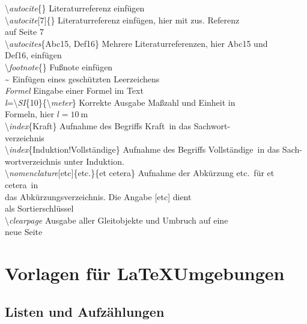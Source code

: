 \begin{tabbing}
	\textbackslash \textit{autocite}\{\}	\> Literaturreferenz einfügen\\
	\textbackslash \textit{autocite}[7]\{\}	\> Literaturreferenz einfügen, hier mit zus. Referenz\\
	\> auf Seite 7\\
\textbackslash \textit{autocites}\{Abc15, Def16\}	\> Mehrere Literaturreferenzen, hier Abc15 und \\
\> Def16, einfügen\\
\textbackslash \textit{footnote}\{\}	\> Fußnote einfügen\\ 
\~{}	\> Einfügen eines geschützten Leerzeichens\\ 
\textdollar \textit{Formel} \textdollar	\> Eingabe einer Formel im Text\\
\textdollar\textit{l}=\textbackslash \textit{SI}\{10\}\{\textbackslash \textit{meter}\}\textdollar	\> Korrekte Ausgabe Maßzahl und Einheit in\\
\> Formeln, hier $l=\SI{10}{\meter}$\\
\textbackslash \textit{index}\{Kraft\} \> Aufnahme des Begriffs \glqq Kraft\grqq~in das Sachwort-  \\
\> verzeichnis\\
\textbackslash \textit{index}\{Induktion!Vollständige\} \> Aufnahme des Begriffs \glqq Vollständige\grqq~in das Sach-\\
\> wortverzeichnis unter \glqq Induktion\grqq.  \\
\textbackslash \textit{nomenclature}[etc]\{etc.\}\{et cetera\}	\> Aufnahme der Abkürzung \glqq etc.\grqq~für \glqq et cetera\grqq~in \\
\> das Abkürzungsverzeichnis. Die Angabe [etc] dient\\
\>als Sortierschlüssel\\
\textbackslash \textit{clearpage}	\> Ausgabe aller Gleitobjekte und Umbruch auf eine\\
\> neue Seite\\ 
\end{tabbing}

\clearpage

\section{Vorlagen für \LaTeX Umgebungen}

\subsection{Listen und Aufzählungen}

